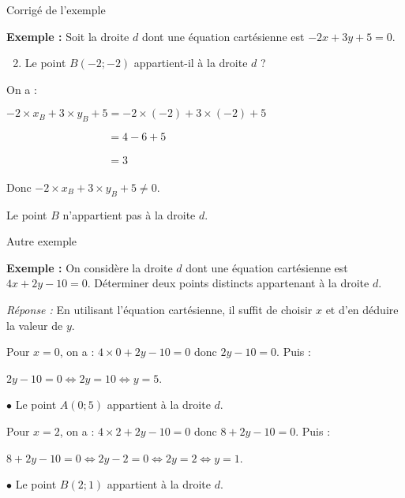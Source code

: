 \documentclass[12pt]{beamer}
\begin{document}
\begin{frame}{Corrigé de l'exemple}

\textbf{Exemple :} Soit la droite $d$ dont une équation cartésienne est $-2x+3y + 5 = 0$.

\medskip

\begin{enumerate}
\setcounter{enumi}{1}
\item Le point $B(-2;-2)$ appartient-il à la droite $d$ ?
\end{enumerate}

On a : 

\medskip

$-2 \times x_B + 3 \times y_B + 5 = -2 \times (-2) + 3 \times (-2) + 5$ \par 
$\phantom{-2 \times x_A + 3 \times y_A + 5} = 4 - 6 + 5$ \par 
$\phantom{-2 \times x_A + 3 \times y_A + 5} = 3$

\bigskip

Donc $-2 \times x_B + 3 \times y_B + 5 \neq 0$. 

\medskip

Le point $B$ n'appartient pas à la droite $d$.

\end{frame}

\begin{frame}{Autre exemple}

\textbf{Exemple : } On considère la droite $d$ dont une équation cartésienne est $4x+2y-10 = 0$. Déterminer deux points distincts appartenant à la droite $d$.

\bigskip

\textit{Réponse :} En utilisant l'équation cartésienne, il suffit de choisir $x$ et d'en déduire la valeur de $y$.

\medskip

Pour $x = 0$, on a : $4 \times 0 + 2y - 10 = 0$ donc $2y-10 = 0$. Puis : \par 
$2y-10 = 0 \Longleftrightarrow 2y = 10 \Longleftrightarrow y = 5$.

\medskip

$\bullet$ Le point $A(0;5)$ appartient à la droite $d$.

\medskip

Pour $x = 2$, on a : $4 \times 2 + 2y - 10 = 0$ donc $8 + 2y-10 = 0$. Puis : \par 
$8 + 2y-10 = 0 \Longleftrightarrow 2y-2 = 0 \Longleftrightarrow 2y = 2 \Longleftrightarrow y = 1$.

\medskip

$\bullet$ Le point $B(2;1)$ appartient à la droite $d$.

\end{frame}
\end{document}
